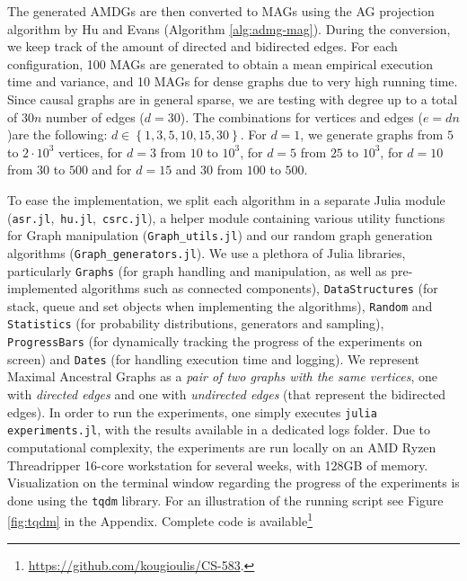 \documentclass[a4paper]{article}
\begin{document}
The generated AMDGs are then converted to MAGs using the AG projection algorithm by Hu and Evans (Algorithm \ref{alg:admg-mag}). During the conversion, we keep track of the amount of directed and bidirected edges. For each configuration, 100 MAGs are generated to obtain a mean empirical execution time and variance, and 10 MAGs for dense graphs due to very high running time. Since causal graphs are in general sparse, we are testing with degree up to a total of $30n$ number of edges ($d=30$). The combinations for vertices and edges ($e=dn$)are the following:  $d \in \left\{1,3,5,10,15,30 \right\}$. For $d=1$, we generate graphs from $5$ to $2 \cdot 10^3$ vertices, for $d=3$ from $10$ to $10^3$, for $d=5$ from $25$ to $10^3$, for $d=10$ from $30$ to $500$ and for $d=15$ and $30$ from $100$ to $500$.

To ease the implementation, we split each algorithm in a separate Julia module (\texttt{asr.jl},~\texttt{hu.jl},~\texttt{csrc.jl}), a helper module containing various utility functions for Graph manipulation (\texttt{Graph\_utils.jl}) and our random graph generation algorithms (\texttt{Graph\_generators.jl}). We use a plethora of Julia libraries, particularly \texttt{Graphs} (for graph handling and manipulation, as well as pre-implemented algorithms such as connected components), \texttt{DataStructures} (for stack, queue and set objects when implementing the algorithms), \texttt{Random} and \texttt{Statistics} (for probability distributions, generators and sampling), \texttt{ProgressBars} (for dynamically tracking the progress of the experiments on screen) and \texttt{Dates} (for handling execution time and logging). We represent Maximal Ancestral Graphs as a \textit{pair of two graphs with the same vertices}, one with \textit{directed edges} and one with \textit{undirected edges} (that represent the bidirected edges). In order to run the experiments, one simply executes \texttt{julia experiments.jl}, with the results available in a dedicated logs folder. Due to computational complexity, the experiments are run locally on an AMD Ryzen Threadripper 16-core workstation for several weeks, with 128GB of memory. Visualization on the terminal window regarding the progress of the experiments is done using the \texttt{tqdm} library. For an illustration of the running script see Figure \ref{fig:tqdm} in the Appendix. Complete code is available\footnote{\url{https://github.com/kougioulis/CS-583}.}
\end{document}
